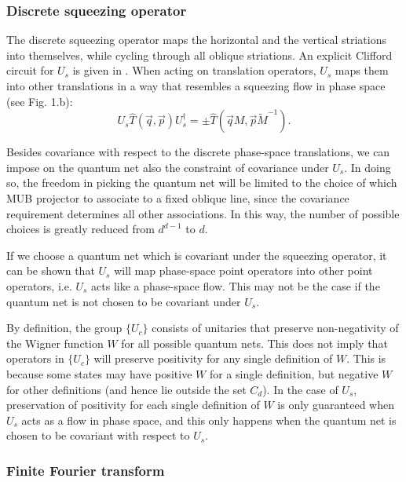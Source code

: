 \documentclass[aps,twocolumn,showpacs,nofootinbib,superscriptaddress]{revtex4}
\begin{document}
\subsubsection{Discrete squeezing operator}

The discrete squeezing operator \cite{PazRS04b} maps the
horizontal and the vertical striations into themselves, while
cycling through all oblique striations. An explicit Clifford
circuit for $U_s$ is given in \cite{PazRS04b}. When acting on
translation operators, $U_s$ maps them into other translations in
a way that resembles a squeezing flow in phase space (see Fig.
1.b):
\begin{equation}
U_s \hat{T}(\vec {q}, \vec {p}) U_s^\dagger = \pm \hat{T}(\vec {q}M, \vec {p} \widetilde {M} ^{-1}).
\end{equation}

Besides covariance with respect to the discrete phase-space translations,
we can impose on the quantum net also the constraint of covariance under
$U_s$.  In doing so, the freedom in picking the quantum net will be limited to the choice of which MUB projector to associate to a fixed oblique line, since the covariance requirement determines all other associations. In this way, the number of possible choices
is greatly reduced from $d^{d-1}$ to $d$.

If we choose a quantum net which is covariant under the squeezing
operator, it can be shown that $U_s$ will map phase-space point
operators into other point operators, i.e. $U_s$ acts like a
phase-space flow. This may not be the case if the quantum net is
not chosen to be covariant under $U_s$.

By definition, the group $\{U_c\}$ consists of unitaries that preserve non-negativity of the Wigner function $W$ for all possible quantum nets. This does not imply that operators in $\{U_c\}$ will preserve positivity for any single definition of $W$. This is because some states may have positive $W$ for a single definition, but negative $W$ for other definitions (and hence lie outside the set $C_d$). In the case of $U_s$, preservation of positivity for each single definition of $W$ is only guaranteed when $U_s$ acts as a flow in phase space, and this only happens when the quantum net is chosen to be covariant with respect to $U_s$.

\subsubsection{Finite Fourier transform}
\end{document}
